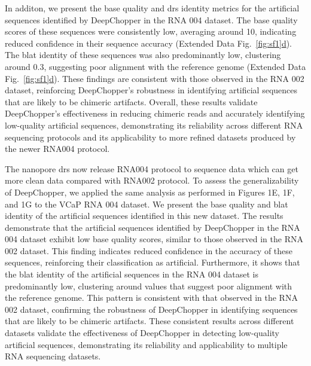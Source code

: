 \documentclass[pdflatex, sn-mathphys-num, lineno]{sn-jnl}%
\newcommand{\edfigref}[2]{Extended Data Fig.~\hyperref[#1]{\ref*{#1}#2}}
\theoremstyle{thmstyleone}%
\theoremstyle{thmstyletwo}%
\theoremstyle{thmstylethree}%
\begin{document}
In additon, we present the base quality and \gls{drs} identity metrics for the artificial sequences identified by DeepChopper in the RNA 004 dataset.
The base quality scores of these sequences were consistently low, averaging around 10, indicating reduced confidence in their sequence accuracy (\edfigref{fig:sf1}{d}).
The \gls{blat} identity of these sequences was also predominantly low, clustering around 0.3, suggesting poor alignment with the reference genome (\edfigref{fig:sf1}{d}).
These findings are consistent with those observed in the RNA 002 dataset, reinforcing DeepChopper's robustness in identifying artificial sequences that are likely to be chimeric artifacts.
Overall, these results validate DeepChopper's effectiveness in reducing chimeric reads and accurately identifying low-quality artificial sequences, demonstrating its reliability across different RNA sequencing protocols and its applicability to more refined datasets produced by the newer RNA004 protocol.


The nanopore \gls{drs} now release RNA004 protocol to sequence data which can get more clean data compared with RNA002 protocol.
To assess the generalizability of DeepChopper, we applied the same analysis as performed in Figures 1E, 1F, and 1G to the VCaP RNA 004 dataset.
We present the base quality and \gls{blat} identity of the artificial sequences identified in this new dataset.
The results demonstrate that the artificial sequences identified by DeepChopper in the RNA 004 dataset exhibit low base quality scores, similar to those observed in the RNA 002 dataset.
This finding indicates reduced confidence in the accuracy of these sequences, reinforcing their classification as artificial.
Furthermore, it shows that the \gls{blat} identity of the artificial sequences in the RNA 004 dataset is predominantly low, clustering around values that suggest poor alignment with the reference genome.
This pattern is consistent with that observed in the RNA 002 dataset, confirming the robustness of DeepChopper in identifying sequences that are likely to be chimeric artifacts.
These consistent results across different datasets validate the effectiveness of DeepChopper in detecting low-quality artificial sequences, demonstrating its reliability and applicability to multiple RNA sequencing datasets.
\end{document}
